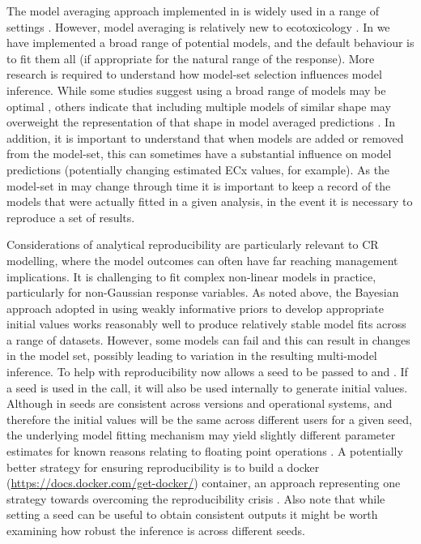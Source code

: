 \documentclass[
  shortnames]{jss}
\begin{document}
The model averaging approach implemented in  is widely used in a range of settings \citep[in ecology for example, see][ for a thorough review]{Dormann2018}. However, model averaging is relatively new to ecotoxicology \citep[but see, for example,][]{Shao2014, Thorley2018, fox2020, Wheeler2009}. In  we have implemented a broad range of potential models, and the default behaviour is to fit them all (if appropriate for the natural range of the response). More research is required to understand how model-set selection influences model inference. While some studies suggest using a broad range of models may be optimal \citep{Wheeler2009}, others indicate that including multiple models of similar shape may overweight the representation of that shape in model averaged predictions \citep{fox2020}. In addition, it is important to understand that when models are added or removed from the model-set, this can sometimes have a substantial influence on model predictions (potentially changing estimated ECx values, for example). As the model-set in  may change through time it is important to keep a record of the models that were actually fitted in a given analysis, in the event it is necessary to reproduce a set of results.

Considerations of analytical reproducibility are particularly relevant to CR modelling, where the model outcomes can often have far reaching management implications. It is challenging to fit complex non-linear models in practice, particularly for non-Gaussian response variables. As noted above, the Bayesian approach adopted in  using weakly informative priors to develop appropriate initial values works reasonably well to produce relatively stable model fits across a range of datasets. However, some models can fail and this can result in changes in the model set, possibly leading to variation in the resulting multi-model inference. To help with reproducibility  now allows a seed to be passed to  and . If a seed is used in the  call, it will also be used internally to generate initial values. Although in  seeds are consistent across versions and operational systems, and therefore the initial values will be the same across different users for a given seed, the underlying  model fitting mechanism may yield slightly different parameter estimates for known reasons relating to floating point operations \citep[see chapter 20 in][]{stan2021}. A potentially better strategy for ensuring reproducibility is to build a docker (\url{https://docs.docker.com/get-docker/}) container, an approach representing one strategy towards overcoming the reproducibility crisis \citep{Baker2016}. Also note that while setting a seed can be useful to obtain consistent outputs it might be worth examining how robust the inference is across different seeds.
\end{document}
